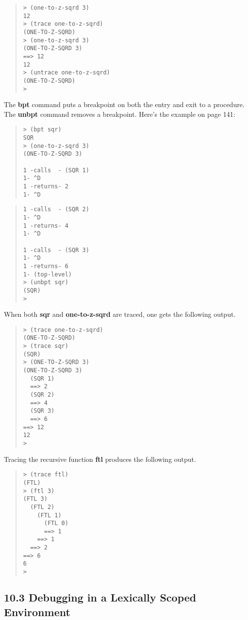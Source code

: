 \documentclass[10pt]{article}
\begin{document}
\begin{quote}
\begin{verbatim}
> (one-to-z-sqrd 3)
12
> (trace one-to-z-sqrd)
(ONE-TO-Z-SQRD)
> (one-to-z-sqrd 3)
(ONE-TO-Z-SQRD 3)
==> 12
12
> (untrace one-to-z-sqrd)
(ONE-TO-Z-SQRD)
>
\end{verbatim}
\end{quote}

The \textbf{bpt} command puts a breakpoint on both the entry and
exit to a procedure.  The \textbf{unbpt} command removes a
breakpoint.  Here's the example on page 141:

\begin{quote}
\begin{verbatim}
> (bpt sqr)
SQR
> (one-to-z-sqrd 3)
(ONE-TO-Z-SQRD 3)

1 -calls  - (SQR 1)
1- ^D
1 -returns- 2
1- ^D
\end{verbatim}
\end{quote}

\begin{quote}
\begin{verbatim}
1 -calls  - (SQR 2)
1- ^D
1 -returns- 4
1- ^D

1 -calls  - (SQR 3)
1- ^D
1 -returns- 6
1- (top-level)
> (unbpt sqr)
(SQR)
>
\end{verbatim}
\end{quote}

When both \textbf{sqr} and \textbf{one-to-z-sqrd} are traced, one gets
the following output.

\begin{quote}
\begin{verbatim}
> (trace one-to-z-sqrd)
(ONE-TO-Z-SQRD)
> (trace sqr)
(SQR)
> (ONE-TO-Z-SQRD 3)
(ONE-TO-Z-SQRD 3)
  (SQR 1)
  ==> 2
  (SQR 2)
  ==> 4
  (SQR 3)
  ==> 6
==> 12
12
>
\end{verbatim}
\end{quote}

Tracing the recursive function \textbf{ftl} produces the following
output.

\begin{quote}
\begin{verbatim}
> (trace ftl)
(FTL)
> (ftl 3)
(FTL 3)
  (FTL 2)
    (FTL 1)
      (FTL 0)
      ==> 1
    ==> 1
  ==> 2
==> 6
6
>
\end{verbatim}
\end{quote}

\subsection*{10.3 Debugging in a Lexically Scoped Environment}
\end{document}
